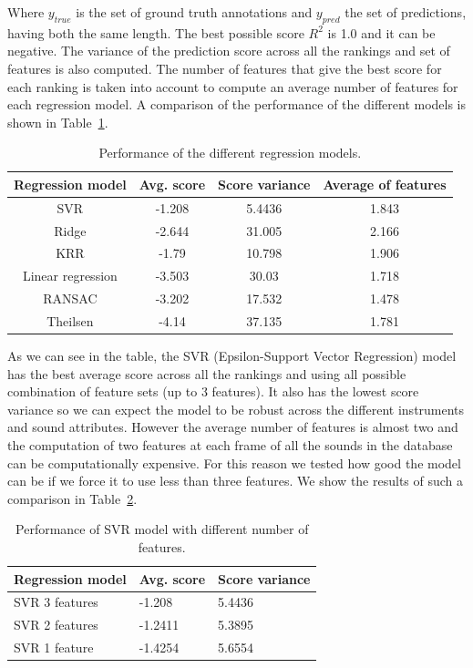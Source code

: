 \documentclass{article}
\begin{document}
Where $y_{true}$ is the set of ground truth annotations and $y_{pred}$ the set of predictions, having both the same length. The best possible score $R^2$ is 1.0 and it can be negative.
The variance of the prediction score across all the rankings and set of features is also computed. 
The number of features that give the best score for each ranking is taken into account to compute an average number of features for each regression model. A comparison of the performance of the different models is shown in Table~\ref{models}.

\begin{table}[ht]
\centering
\label{my-label}
\begin{tabular}{cccc}
\hline
Regression model  & Avg. score & Score variance & Average of features \\ \hline
SVR               & -1.208     & 5.4436         & 1.843               \\
Ridge             & -2.644     & 31.005         & 2.166               \\
KRR               & -1.79      & 10.798         & 1.906               \\
Linear regression & -3.503     & 30.03          & 1.718               \\
RANSAC            & -3.202     & 17.532         & 1.478               \\
Theilsen          & -4.14      & 37.135         & 1.781               \\ \hline
\end{tabular}
\caption{Performance of the different regression models.}
\label{models}
\end{table}

As we can see in the table, the SVR (Epsilon-Support Vector Regression) model has the best average score across all the rankings and using all possible combination of feature sets (up to 3 features). It also has the lowest score variance so we can expect the model to be robust across the different instruments and sound attributes. However the average number of features is almost two and the computation of two features at each frame of all the sounds in the database can be computationally expensive. For this reason we tested how good the model can be if we force it to use less than three features. We show the results of such a comparison in Table~\ref{svr}.

\begin{table}[]
\centering
\label{my-label}
\begin{tabular}{lll}
\hline
Regression model & Avg. score & Score variance \\ \hline
SVR 3 features   & -1.208     & 5.4436         \\
SVR 2 features   & -1.2411    & 5.3895         \\
SVR 1 feature    & -1.4254    & 5.6554         \\ \hline
\end{tabular}
\caption{Performance of SVR model with different number of features.}
\label{svr}
\end{table}
\end{document}

